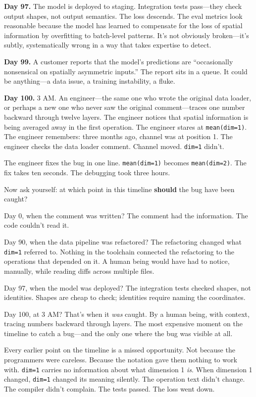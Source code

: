 \documentclass[11pt,titlepage]{article}
\begin{document}
\textbf{Day 97.} The model is deployed to staging. Integration tests
pass---they check output shapes, not output semantics. The loss
descends. The eval metrics look reasonable because the model has learned
to compensate for the loss of spatial information by overfitting to
batch-level patterns. It's not obviously broken---it's subtly,
systematically wrong in a way that takes expertise to detect.

\textbf{Day 99.} A customer reports that the model's predictions are
``occasionally nonsensical on spatially asymmetric inputs.'' The report
sits in a queue. It could be anything---a data issue, a training
instability, a fluke.

\textbf{Day 100.} 3 AM. An engineer---the same one who wrote the
original data loader, or perhaps a new one who never saw the original
comment---traces one number backward through twelve layers. The engineer
notices that spatial information is being averaged away in the first
operation. The engineer stares at \texttt{mean(dim=1)}. The engineer
remembers: three months ago, channel was at position 1. The engineer
checks the data loader comment. Channel moved. \texttt{dim=1} didn't.

The engineer fixes the bug in one line. \texttt{mean(dim=1)} becomes
\texttt{mean(dim=2)}. The fix takes ten seconds. The debugging took
three hours.

Now ask yourself: at which point in this timeline \textbf{should} the
bug have been caught?

Day 0, when the comment was written? The comment had the information.
The code couldn't read it.

Day 90, when the data pipeline was refactored? The refactoring changed
what \texttt{dim=1} referred to. Nothing in the toolchain connected the
refactoring to the operations that depended on it. A human being would
have had to notice, manually, while reading diffs across multiple files.

Day 97, when the model was deployed? The integration tests checked
shapes, not identities. Shapes are cheap to check; identities require
naming the coordinates.

Day 100, at 3 AM? That's when it \emph{was} caught. By a human being,
with context, tracing numbers backward through layers. The most
expensive moment on the timeline to catch a bug---and the only one where
the bug was visible at all.

Every earlier point on the timeline is a missed opportunity. Not because
the programmers were careless. Because the notation gave them nothing to
work with. \texttt{dim=1} carries no information about what dimension 1
\emph{is}. When dimension 1 changed, \texttt{dim=1} changed its meaning
silently. The operation text didn't change. The compiler didn't
complain. The tests passed. The loss went down.
\end{document}
